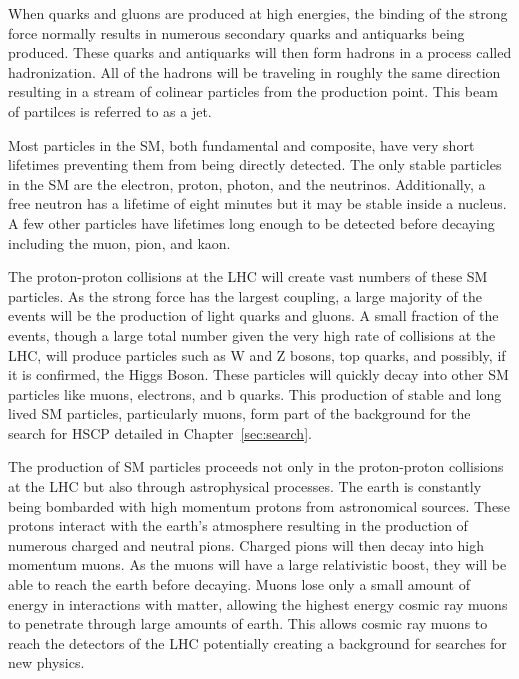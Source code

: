 When quarks and gluons are produced at high energies, the binding of the strong force normally results in numerous secondary quarks and antiquarks being produced.
These quarks and antiquarks will then form hadrons in a process called hadronization.
All of the hadrons will be traveling in roughly the same direction resulting in a stream of colinear particles from the production point.
This beam of partilces is referred to as a jet.

Most particles in the SM, both fundamental and composite, have very short lifetimes preventing them from being directly detected. The only stable particles
in the SM are the electron, proton, photon, and the neutrinos. Additionally, a free neutron has a lifetime of eight minutes but it may be stable inside a nucleus.
A few other particles have lifetimes long enough to be detected before decaying including the muon, pion, and kaon.

The proton-proton collisions at the LHC will create vast numbers of these SM particles. As the strong force has the largest coupling,
a large majority of the events will be the production of light quarks and gluons. A small fraction of the events, though a large total number given the very
high rate of collisions at the LHC, will produce particles such as W and Z bosons, top quarks, and possibly, if it is confirmed, the Higgs Boson.
These particles will quickly decay into other SM particles like muons, electrons, and b quarks. This production of stable and long lived SM particles,
particularly muons, form part of the background for the search for HSCP detailed in Chapter~\ref{sec:search}.

The production of SM particles proceeds not only in the proton-proton collisions at the LHC but also through astrophysical processes.
The earth is constantly being bombarded with high momentum protons from astronomical sources. These protons interact with the earth's atmosphere
resulting in the production of numerous charged and neutral pions. Charged pions will then decay into high momentum muons.
As the muons will have a large relativistic boost, they will be able to reach the earth before decaying.
Muons lose only a small amount of energy in interactions with matter,
allowing the highest energy cosmic ray muons to penetrate through large amounts of earth.
This allows cosmic ray muons to reach the detectors of the LHC potentially creating a background for searches for new physics.


